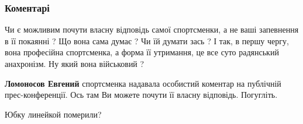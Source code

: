  
 
 
 
 
\subsubsection{Коментарі}
\label{sec:13_08_2021.fb.maljar_ganna.1.maguchih_vstrecha.cmt}

\begin{itemize}
 

Чи є можливим почути власну відповідь самої спортсменки, а не ваші запевнення в
її покаянні ? Що вона сама думає ? Чи їй думати зась ? І так, в першу чергу,
вона професійна спортсменка, а форма її утримання, це все суто радянський
анахронізм. Ну який вона військовий ?

\begin{itemize}
 
\textbf{Ломоносов Евгений} спортсменка надавала особистий коментар на публічній
прес-конференції. Ось там Ви можете почути її власну відповідь. Погугліть.
\end{itemize}

 

Юбку линейкой померили?

 

\end{itemize}

